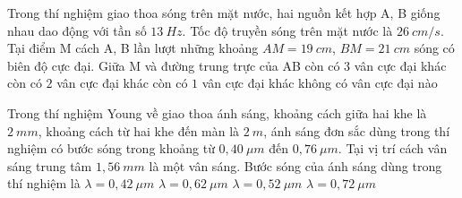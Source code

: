 	\begin{ex}%
		Trong thí nghiệm giao thoa sóng trên mặt nước, hai nguồn kết hợp A, B giống nhau dao động với tần số $13\ Hz$. Tốc độ truyền sóng trên mặt nước là $26\ cm/s$. Tại điểm M cách A, B lần lượt những khoảng $AM=19\ cm$, $BM=21\ cm$ sóng có biên độ cực đại. Giữa M và đường trung trực của AB 
		\choice
		{còn có $3$ vân cực đại khác}
		{còn có $2$ vân cực đại khác}
		{còn có $1$ vân cực đại khác}
		{\True không có vân cực đại nào}
	\end{ex}
		\begin{ex}%
		Trong thí nghiệm Young về giao thoa ánh sáng, khoảng cách giữa hai khe là $2\ mm$, khoảng cách từ hai khe đến màn là $2\ m$, ánh sáng đơn sắc dùng trong thí nghiệm có bước sóng trong khoảng từ $0,40\ \mu m$ đến $0,76\ \mu m$. Tại vị trí cách vân sáng trung tâm $1,56\ mm$ là một vân sáng. Bước sóng của ánh sáng dùng trong thí nghiệm là
		\choice
		{$\lambda =0,42\ \mu m$}
		{$\lambda =0,62\ \mu m$}
		{\True $\lambda =0,52\ \mu m$}
		{$\lambda =0,72\ \mu m$}
	\end{ex}
